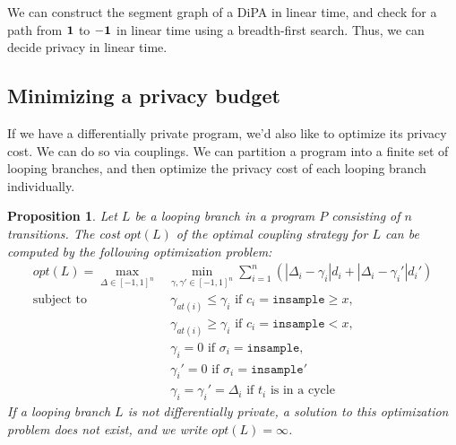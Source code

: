 \documentclass[12pt]{article}
\newcommand{\gguard}[1][x]{\texttt{insample}\geq#1}
\newcommand{\lguard}[1][x]{\texttt{insample} < #1}
\newtheorem{prop}[thm]{Proposition}
\theoremstyle{definition}
\begin{document}
We can construct the segment graph of a DiPA in linear time, and check for a path from $\bf 1$ to $\bf -1$ in linear time using a breadth-first search. Thus, we can decide privacy in linear time.

\subsection{Minimizing a privacy budget}

If we have a differentially private program, we'd also like to optimize its privacy cost. We can do so via couplings. We can partition a program into a finite set of looping branches, and then optimize the privacy cost of each looping branch individually.

\begin{prop}
    \label{prop:compute_opt_cost}
    Let $L$ be a looping branch in a program $P$ consisting of $n$ transitions. The cost $opt(L)$ of the optimal coupling strategy for $L$ can be computed by the following optimization problem: 
    \begin{align*}
        opt(L) = \max_{\Delta \in [-1, 1]^n} &\min_{\gamma, \gamma' \in [-1, 1]^n} \sum_{i = 1}^n \left(|\Delta_i - \gamma_i| d_i + |\Delta_i - \gamma_i'|d_i' \right)\\ 
            \text{subject to }
            &\ \gamma_{at(i)} \leq \gamma_i \text{ if } c_i = \gguard, \\
            &\ \gamma_{at(i)} \geq \gamma_i \text{ if } c_i = \lguard, \\
            &\ \gamma_i = 0 \text{ if } \sigma_i = \texttt{insample}, \\
            &\ \gamma_i' = 0 \text{ if } \sigma_i = \texttt{insample}'\\
            &\ \gamma_i = \gamma_i'= \Delta_i \text{ if } t_i \text{ is in a cycle}
    \end{align*}
    If a looping branch $L$ is not differentially private, a solution to this optimization problem does not exist, and we write $opt(L) = \infty$.
\end{prop}
\end{document}

